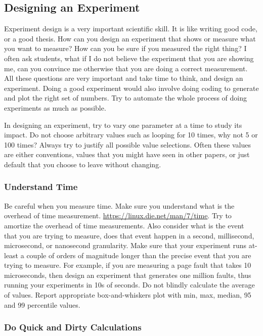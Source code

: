 \documentclass[11pt]{article}
\begin{document}
\subsection*{Designing an Experiment} 
Experiment design is a very important scientific skill. It is like writing good code, or a good thesis. How can you design an experiment that shows or measure what you want to measure? How can you be sure if you measured the right thing? I often ask students, what if I do not believe the experiment that you are showing me, can you convince me otherwise that you are doing a correct measurement. All these questions are very important and take time to think, and design an experiment. Doing a good experiment would also involve doing coding to generate and plot the right set of numbers. Try to automate the whole process of doing experiments as much as possible. 

In designing an experiment, try to vary one parameter at a time to study its impact. Do not choose arbitrary values such as looping for 10 times, why not 5 or 100 times? Always try to justify all possible value selections. Often these values are either conventions, values that you might have seen in other papers, or just default that you choose to leave without changing. 

\subsubsection*{Understand Time} 
Be careful when you measure time. Make sure you understand what is the overhead of time measurement. \url{https://linux.die.net/man/7/time}. Try to amortize the overhead of time measurements. Also consider what is the event that you are trying to measure, does that event happen in a second, millisecond, microsecond, or nanosecond granularity. Make sure that your experiment runs at-least a couple of orders of magnitude longer than the precise event that you are trying to measure. For example, if you are measuring a page fault that takes 10 microseconds, then design an experiment that generates one million faults, thus running your experiments in 10s of seconds. Do not blindly calculate the average of values. Report appropriate box-and-whiskers plot with min, max, median, 95 and 99 percentile values. 


\subsubsection*{Do Quick and Dirty Calculations} 
\end{document}
